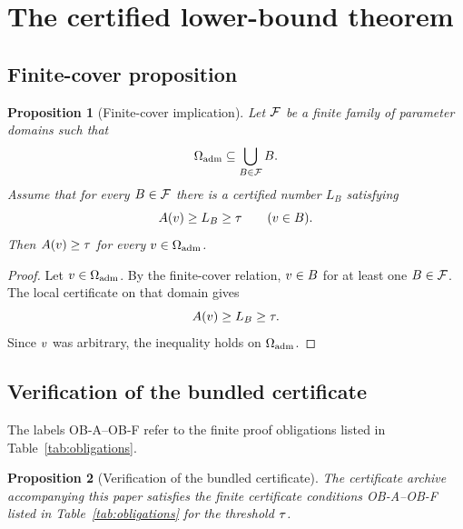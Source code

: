 \documentclass[11pt]{article}
\newtheorem{proposition}{Proposition}
\begin{document}
\section{The certified lower-bound theorem}\label{sec:theorem}

\subsection{Finite-cover proposition}

\begin{proposition}[Finite-cover implication]\label{prop:finite-cover}
Let \(\mathcal{F}\) be a finite family of parameter domains such that
\[
\Omega_{\mathrm{adm}}\subseteq\bigcup_{B\in\mathcal{F}}B.
\]
Assume that for every \(B\in\mathcal{F}\) there is a certified number \(L_B\) satisfying
\[
A(v)\ge L_B\ge\tau
\qquad(v\in B).
\]
Then \(A(v)\ge\tau\) for every \(v\in\Omega_{\mathrm{adm}}\).
\end{proposition}

\begin{proof}
Let \(v\in\Omega_{\mathrm{adm}}\).  By the finite-cover relation, \(v\in B\) for at least one \(B\in\mathcal{F}\).  The local certificate on that domain gives
\[
A(v)\ge L_B\ge\tau.
\]
Since \(v\) was arbitrary, the inequality holds on \(\Omega_{\mathrm{adm}}\).
\end{proof}

\subsection{Verification of the bundled certificate}

The labels OB-A--OB-F refer to the finite proof obligations listed in Table~\ref{tab:obligations}.

\begin{proposition}[Verification of the bundled certificate]\label{prop:bundled-certificate}
The certificate archive accompanying this paper satisfies the finite certificate conditions OB-A--OB-F listed in Table~\ref{tab:obligations} for the threshold \(\tau\).
\end{proposition}
\end{document}
